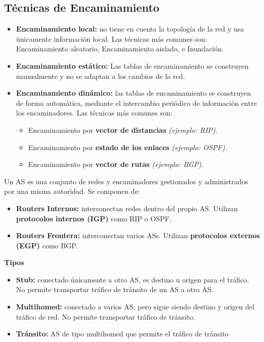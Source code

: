 \subsection{Técnicas de Encaminamiento}
\begin{itemize}
    \item \textbf{Encaminamiento local: } no tiene en cuenta la topología de la red y usa únicamente información local. Las técnicas más comunes son: Encaminamiento aleatorio, Encaminamiento aislado, e Inundación.
    \item \textbf{Encaminamiento estático: }Las tablas de encaminamiento se construyen manualmente y no se adaptan a los cambios de la red.
    \item \textbf{Encaminamiento dinámico: }las tablas de encaminamiento se construyen de forma automática, mediante el intercambio periódico de información entre los encaminadores. Las técnicas más comunes son:
    \begin{itemize}
        \item Encaminamiento por \textbf{vector de distancias} \textit{(ejemplo: RIP)}.
        \item Encaminamiento por \textbf{estado de los enlaces} \textit{(ejemplo: OSPF)}.
        \item Encaminamiento por \textbf{vector de rutas} \textit{(ejemplo: BGP)}.
    \end{itemize}
    \end{itemize}
    \begin{tcolorbox}[
    title=Sistemas Autónomos (AS),
    colback=blue!5!white,
    colframe=blue!75!black,
    fonttitle=\bfseries]
    Un AS es una conjunto de redes y encaminadores gestionados y administrados por una misma autoridad. Se componen de:
    \begin{itemize}
        \item \textbf{Routers Internos: }interconectan redes dentro del propio AS. Utilizan \textbf{protocolos internos (IGP)} como RIP o OSPF.
        \item \textbf{Routers Frontera: }interconectan varios ASs. Utilizan \textbf{protocolos externos (EGP)} como BGP.
    \end{itemize}
    \textbf{Tipos}
    
    \begin{itemize}
        \item \textbf{Stub:} conectado únicamente a otro AS, es destino u origen para el tráfico. No permite transportar tráfico de tránsito de un AS a otro AS.
        \item \textbf{Multihomed:} conectado a varios AS, pero sigue siendo destino y origen del tráfico de red. No permite transportar tráfico de tránsito.
        \item \textbf{Tránsito:} AS de tipo multihomed que permite el tráfico de tránsito
    \end{itemize}
    \end{tcolorbox}
